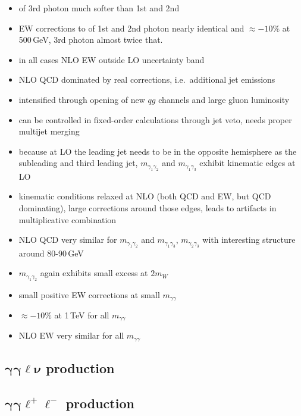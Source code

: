 \begin{itemize}
  \item \pT of 3rd photon much softer than 1st and 2nd
  \item EW corrections to \pT of 1st and 2nd photon nearly identical and 
        $\approx -10\%$ at 500\,GeV, 3rd photon almost twice that.
  \item in all cases NLO EW outside LO uncertainty band
  \item NLO QCD dominated by real corrections, i.e.\ additional 
        jet emissions
  \item intensified through opening of new $qg$ channels and large 
        gluon luminosity
  \item can be controlled in fixed-order calculations through jet veto, 
        needs proper multijet merging
  \item because at LO the leading jet needs to be in the opposite 
        hemisphere as the subleading and third leading jet, 
        $m_{\gamma_1\gamma_2}$ and $m_{\gamma_1\gamma_3}$ 
        exhibit kinematic edges at LO
  \item kinematic conditions relaxed at NLO (both QCD and EW, 
        but QCD dominating), large corrections around those edges, 
        leads to artifacts in multiplicative combination
  \item NLO QCD very similar for $m_{\gamma_1\gamma_2}$ and 
	$m_{\gamma_1\gamma_3}$, $m_{\gamma_2\gamma_3}$ with interesting 
	structure around 80-90\,GeV
  \item $m_{\gamma_1\gamma_2}$ again exhibits small excess at $2m_W$
  \item small positive EW corrections at small $m_{\gamma\gamma}$ 
  \item $\approx -10\%$ at 1\,TeV for all $m_{\gamma\gamma}$ 
  \item NLO EW very similar for all $m_{\gamma\gamma}$ 
\end{itemize}



\subsection{\texorpdfstring{$\boldsymbol{\gamma\gamma\ell\nu}$}{aalnu} production}
\label{sec:results:aaw}

\subsection{\texorpdfstring{$\boldsymbol{\gamma\gamma\ell^+\ell^-}$}{aall} production}
\label{sec:results:aaz}

